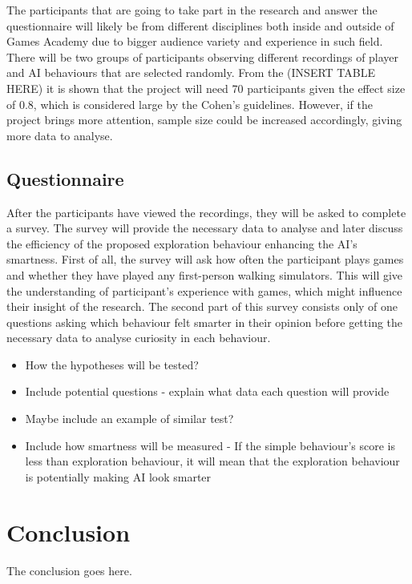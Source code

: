 \documentclass[journal]{IEEEtran}
\begin{document}
The participants that are going to take part in the research and answer the questionnaire will likely be from different disciplines both inside and outside of Games Academy due to bigger audience variety and experience in such field. There will be two groups of participants observing different recordings of player and AI behaviours that are selected randomly. From the (INSERT TABLE HERE) it is shown that the project will need 70 participants given the effect size of 0.8, which is considered large by the Cohen's guidelines. However, if the project brings more attention, sample size could be increased accordingly, giving more data to analyse.

\subsection{Questionnaire}
After the participants have viewed the recordings, they will be asked to complete a survey. The survey will provide the necessary data to analyse and later discuss the efficiency of the proposed exploration behaviour enhancing the AI's smartness. First of all, the survey will ask how often the participant plays games and whether they have played any first-person walking simulators. This will give the understanding of participant's experience with games, which might influence their insight of the research. The second part of this survey consists only of one questions asking which behaviour felt smarter in their opinion before getting the necessary data to analyse curiosity in each behaviour.

\begin{itemize}
	\item How the hypotheses will be tested?
	\item Include potential questions - explain what data each question will provide
	\item Maybe include an example of similar test?
	\item Include how smartness will be measured - If the simple behaviour's score is less than exploration behaviour, it will mean that the exploration behaviour is potentially making AI look smarter
\end{itemize}

\section{Conclusion}
The conclusion goes here.

\end{document}
